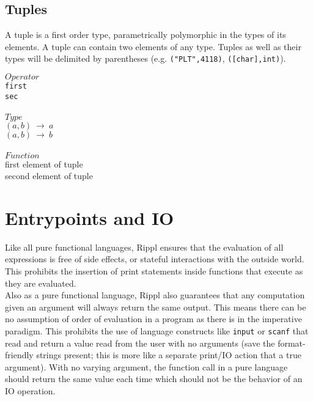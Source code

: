 ﻿\documentclass[5pt]{article}
\begin{document}
\subsection{Tuples}
A tuple is a first order type, parametrically polymorphic in the types of its 
elements. A tuple can contain two elements of any type. Tuples as well as their 
types will be delimited by parentheses (e.g. \texttt{("PLT",4118)}, 
\texttt{([char],int)}).
\begin{multicols}{3}
\noindent $Operator$ \\
\hspace*{5mm} \texttt{first} \\
\hspace*{5mm} \texttt{sec} \\
\columnbreak \\
\noindent $Type$ \\
$(a,b) \ \rightarrow \  a$ \\
$(a,b) \ \rightarrow \  b$ \\
\columnbreak \\
\noindent $Function$ \\
first element of tuple \\
second element of tuple \\
\end{multicols}

\section{Entrypoints and IO}
Like all pure functional languages, Rippl ensures that the evaluation of all expressions is free of side effects, or stateful interactions with the outside world. This prohibits the insertion of print statements inside functions that execute as they are evaluated. \\

Also as a pure functional language, Rippl also guarantees that any computation given an argument will always return the same output. This means there can be no assumption of order of evaluation in a program as there is in the imperative paradigm. This prohibits the use of language constructs like \texttt{input} or \texttt{scanf} that read and return a value read from the user with no arguments (save the format-friendly strings present; this is more like a separate print/IO action that a true argument). With no varying argument, the function call in a pure language should return the same value each time which should not be the behavior of an IO operation. \\
\end{document}
